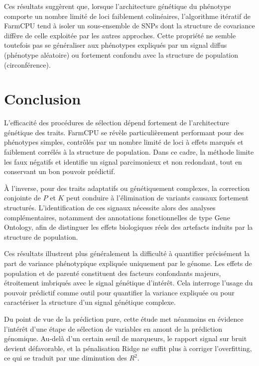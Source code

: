 \documentclass[
  11pt,
  letterpaper,
  DIV=11,
  numbers=noendperiod]{scrartcl}
\begin{document}
Ces résultats suggèrent que, lorsque l'architecture génétique du
phénotype comporte un nombre limité de loci faiblement colinéaires,
l'algorithme itératif de FarmCPU tend à isoler un sous-ensemble de SNPs
dont la structure de covariance diffère de celle exploitée par les
autres approches. Cette propriété ne semble toutefois pas se généraliser
aux phénotypes expliqués par un signal diffus (phénotype aléatoire) ou
fortement confondu avec la structure de population (circonférence).

\hypertarget{conclusion}{%
\section{Conclusion}\label{conclusion}}

L'efficacité des procédures de sélection dépend fortement de
l'architecture génétique des traits. FarmCPU se révèle particulièrement
performant pour des phénotypes simples, contrôlés par un nombre limité
de loci à effets marqués et faiblement corrélés à la structure de
population. Dans ce cadre, la méthode limite les faux négatifs et
identifie un signal parcimonieux et non redondant, tout en conservant un
bon pouvoir prédictif.

À l'inverse, pour des traits adaptatifs ou génétiquement complexes, la
correction conjointe de \(P\) et \(K\) peut conduire à l'élimination de
variants causaux fortement structurés. L'identification de ces signaux
nécessite alors des analyses complémentaires, notamment des annotations
fonctionnelles de type Gene Ontology, afin de distinguer les effets
biologiques réels des artefacts induits par la structure de population.

Ces résultats illustrent plus généralement la difficulté à quantifier
précisément la part de variance phénotypique expliquée uniquement par le
génome. Les effets de population et de parenté constituent des facteurs
confondants majeurs, étroitement imbriqués avec le signal génétique
d'intérêt. Cela interroge l'usage du pouvoir prédictif comme outil pour
quantifier la variance expliquée ou pour caractériser la structure d'un
signal génétique complexe.

Du point de vue de la prédiction pure, cette étude met néanmoins en
évidence l'intérêt d'une étape de sélection de variables en amont de la
prédiction génomique. Au-delà d'un certain seuil de marqueurs, le
rapport signal sur bruit devient défavorable, et la pénalisation Ridge
ne suffit plus à corriger l'overfitting, ce qui se traduit par une
diminution des \(R^2\).
\end{document}
